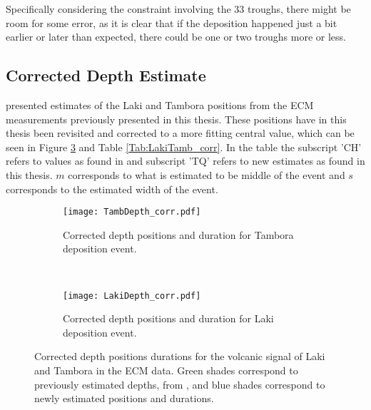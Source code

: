 \documentclass[../../CompleteThesis2/Complete_2ndDraft]{subfiles}
\begin{document}
Specifically considering the constraint involving the 33 troughs, there might be room for some error, as it is clear that if the deposition happened just a bit earlier or later than expected, there could be one or two troughs more or less. 

\subsection[Corrected Depth]{Corrected Depth Estimate}
\label{Subsec:Data_VolcanicHorizons_CorrDepthEst}

\cite[Clausen \& Hammer, 1988]{ClausenHammer1988} presented estimates of the Laki and Tambora positions from the ECM measurements previously presented in this thesis. These positions have in this thesis been revisited and corrected to a more fitting central value, which can be seen in Figure \ref{fig:DATA_LakiTambDepths_corr} and Table \ref{Tab:LakiTamb_corr}. In the table the subscript 'CH' refers to values as found in \cite[Clausen \& Hammer, 1988]{ClausenHammer1988} and subscript 'TQ' refers to new estimates as found in this thesis. $m$ corresponds to what is estimated to be middle of the event and $s$ corresponds to the estimated width of the event.

\begin{figure}[h]
	\centering
	\begin{subfigure}{.45\textwidth}
		\centering
		\texttt{[image: TambDepth\_corr.pdf]}
		\caption[Corrected Tambora locations]{\footnotesize Corrected depth positions and duration for Tambora deposition event.}
		\label{fig:DATA_TambDepth_corr}
	\end{subfigure}
	~
	\begin{subfigure}{.45\textwidth}
		\centering
		\texttt{[image: LakiDepth\_corr.pdf]}
		\caption[Corrected Laki locations]{\footnotesize Corrected depth positions and duration for Laki deposition event.}
		\label{fig:DATA_LakiDepth_corr}
	\end{subfigure}
	\caption[Corrected depth positions of Laki and Tambora events]{\small Corrected depth positions durations for the volcanic signal of Laki and Tambora in the ECM data. Green shades correspond to previously estimated depths, from \cite[Clausen \& Hammer, 1988]{ClausenHammer1988}, and blue shades correspond to newly estimated positions and durations.}
	\label{fig:DATA_LakiTambDepths_corr}
\end{figure}
\end{document}
